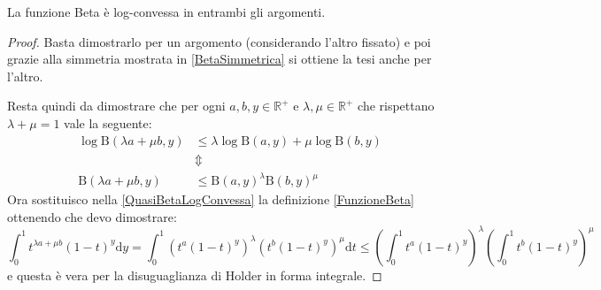 \begin{lemma}\label{BetaLogConvessa} 
	La funzione Beta è log-convessa in entrambi gli argomenti.
\end{lemma}
\begin{proof}
	Basta dimostrarlo per un argomento (considerando l'altro fissato) e poi grazie alla simmetria mostrata in \cref{BetaSimmetrica}
	si ottiene la tesi anche per l'altro.
	
	Resta quindi da dimostrare che per ogni $a,b,y\in\mathbb{R^+}$ e $\lambda,\mu\in\mathbb{R^+}$ che rispettano $\lambda+\mu=1$ vale la seguente:
	\begin{equation}\begin{split}\label{QuasiBetaLogConvessa}
		\log \mathrm{B}(\lambda a+\mu b, y )  & \le \lambda \log \mathrm{B}(a, y ) + \mu\log \mathrm{B}( b, y )\\
		& \Updownarrow  \\
		\mathrm{B}(\lambda a+\mu b, y ) & \le  \mathrm{B}(a,y)^{\lambda}\mathrm{B}(b, y )^{\mu}
	\end{split}\end{equation}
	Ora sostituisco nella \cref{QuasiBetaLogConvessa} la definizione \cref{FunzioneBeta} ottenendo che devo dimostrare:
	\begin{equation*}
		\int_{0}^1 t^{\lambda a+\mu b}(1-t)^y\mathrm{d}y=\int_{0}^1 \left(t^a(1-t)^y\right)^{\lambda}\left(t^b(1-t)^y\right)^{\mu}\mathrm{d}t \le
		\left(\int_{0}^1 t^a(1-t)^y\right)^{\lambda}\left(\int_{0}^1 t^b(1-t)^y\right)^{\mu}
	\end{equation*}
	e questa è vera per la disuguaglianza di Holder in forma integrale.

\end{proof}

